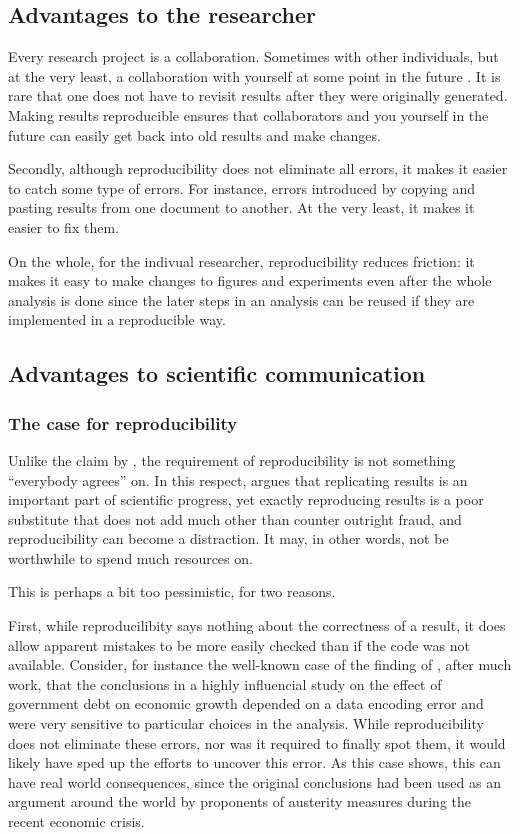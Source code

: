 \documentclass[runningheads,a4paper]{llncs}\usepackage[]{graphicx}\usepackage[]{color}
\begin{document}
\subsection{Advantages to the researcher}
Every research project is a collaboration. Sometimes with other individuals, but at the very least, a collaboration with yourself at some point in the future \cite[Ch.13]{Wickham2015}. It is rare that one does not have to revisit results after they were originally generated. Making results reproducible ensures that collaborators and you yourself in the future can easily get back into old results and make changes.

Secondly, although reproducibility does not eliminate all errors, it makes it easier to catch some type of errors. For instance, errors introduced by copying and pasting results from one document to another. At the very least, it makes it easier to fix them.

On the whole, for the indivual researcher, reproducibility reduces friction: it makes it easy to make changes to figures and experiments even after the whole analysis is done since the later steps in an analysis can be reused if they are implemented in a reproducible way.

\subsection{Advantages to scientific communication}

\subsubsection{The case for reproducibility}
Unlike the claim by \cite{Patil2016}, the requirement of reproducibility is not something ``everybody agrees'' on. In this respect, \cite{Drummond2009}  argues that replicating results is an important part of scientific progress, yet exactly reproducing results is a poor substitute that does not add much other than counter outright fraud, and reproducibility can become a distraction. It may, in other words, not be worthwhile to spend much resources on. 

This is perhaps a bit too pessimistic, for two reasons. 

First, while reproducilibity says nothing about the correctness of a result, it does allow apparent mistakes to be more easily checked than if the code was not available. Consider, for instance the well-known case of the finding of \cite{Herndon2014}, after much work, that the conclusions in a highly influencial study on the effect of government debt on economic growth depended on a data encoding error and were very sensitive to particular choices in the analysis. While reproducibility does not eliminate these errors, nor was it required to finally spot them, it would likely have sped up the efforts to uncover this error. As this case shows, this can have real world consequences, since the original conclusions had been used as an argument around the world by proponents of austerity measures during the recent economic crisis.
\end{document}

